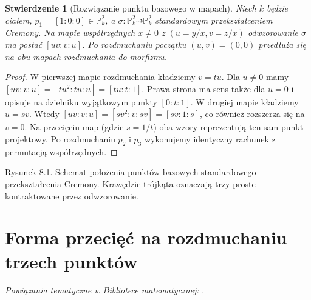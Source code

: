 \documentclass[11pt,a4paper,openany]{report}
\numberwithin{equation}{section}
\theoremstyle{plain}
\newtheorem{stwierdzenie}[twierdzenie]{Stwierdzenie}
\theoremstyle{definition}
\theoremstyle{remark}
\newcommand{\PP}{\mathbb P}
\begin{document}
\begin{stwierdzenie}[Rozwiązanie punktu bazowego w mapach]
\label{st:ga8-local-resolution}
Niech $k$ będzie ciałem, $p_1=[1:0:0]\in\PP^2_k$, a
$\sigma:\PP^2_k\dashrightarrow\PP^2_k$ standardowym
przekształceniem Cremony. Na mapie współrzędnych $x\ne0$
z $(u=y/x,v=z/x)$ odwzorowanie $\sigma$ ma postać
$[uv:v:u]$. Po rozdmuchaniu początku $(u,v)=(0,0)$
przedłuża się na obu mapach rozdmuchania do morfizmu.
\end{stwierdzenie}
\begin{proof}
W pierwszej mapie rozdmuchania kładziemy $v=tu$.
Dla $u\ne0$ mamy
$[uv:v:u]=[tu^2:tu:u]=[tu:t:1]$.
Prawa strona ma sens także dla $u=0$ i opisuje
na dzielniku wyjątkowym punkty $[0:t:1]$.
W drugiej mapie kładziemy $u=sv$. Wtedy
$[uv:v:u]=[sv^2:v:sv]=[sv:1:s]$,
co również rozszerza się na $v=0$.
Na przecięciu map (gdzie $s=1/t$)
oba wzory reprezentują ten sam punkt projektowy.
Po rozdmuchaniu $p_2$ i $p_3$ wykonujemy identyczny
rachunek z permutacją współrzędnych.
\end{proof}

\begin{center}

{\small Rysunek 8.1. Schemat położenia punktów bazowych
standardowego przekształcenia Cremony. Krawędzie trójkąta
oznaczają trzy proste kontraktowane przez odwzorowanie.}\par
\end{center}

\section{Forma przecięć na rozdmuchaniu trzech punktów}
\label{sec:ga8-classes}

\noindent\emph{Powiązania tematyczne w Bibliotece matematycznej:} .
\end{document}
